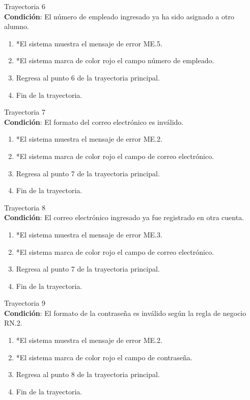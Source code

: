 \large{Trayectoria 6}\\
\textbf{Condición}: El número de empleado ingresado ya ha sido asignado a otro alumno.
\begin{enumerate}
    \item *El sistema muestra el mensaje de error ME.5.
    \item *El sistema marca de color rojo el campo número de empleado.
    \item Regresa al punto 6 de la trayectoria principal.
    \item Fin de la trayectoria.
\end{enumerate}
\large{Trayectoria 7}\\
\textbf{Condición}: El formato del correo electrónico es inválido.
\begin{enumerate}
    \item *El sistema muestra el mensaje de error ME.2.
    \item *El sistema marca de color rojo el campo de correo electrónico.
    \item Regresa al punto 7 de la trayectoria principal.
    \item Fin de la trayectoria.
\end{enumerate}
\large{Trayectoria 8}\\
\textbf{Condición}: El correo electrónico ingresado ya fue registrado en otra cuenta.
\begin{enumerate}
    \item *El sistema muestra el mensaje de error ME.3.
    \item *El sistema marca de color rojo el campo de correo electrónico.
    \item Regresa al punto 7 de la trayectoria principal.
    \item Fin de la trayectoria.
\end{enumerate}
\large{Trayectoria 9}\\
\textbf{Condición}: El formato de la contraseña es inválido según la regla de negocio RN.2.
\begin{enumerate}
    \item *El sistema muestra el mensaje de error ME.2.
    \item *El sistema marca de color rojo el campo de contraseña.
    \item Regresa al punto 8 de la trayectoria principal.
    \item Fin de la trayectoria.
\end{enumerate}
